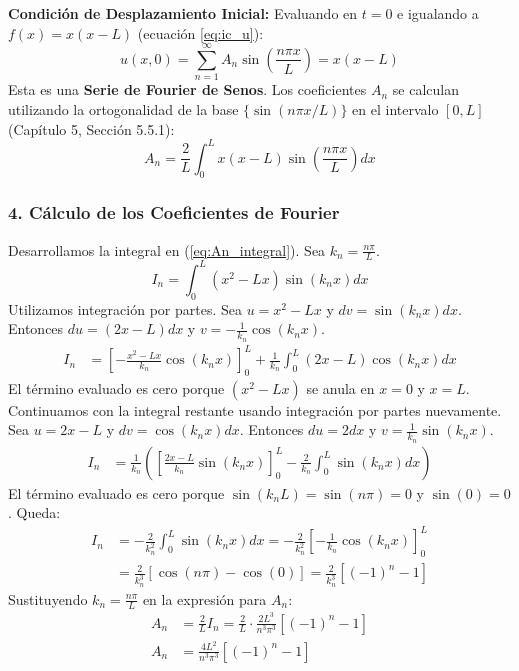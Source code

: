 \documentclass[a4paper]{article}
\begin{document}
\textbf{Condición de Desplazamiento Inicial:}
Evaluando en $t=0$ e igualando a $f(x) = x(x-L)$ (ecuación \ref{eq:ic_u}):
\begin{equation}
u(x, 0) = \sum_{n=1}^{\infty} A_n \sin\left(\frac{n\pi x}{L}\right) = x(x - L)
\end{equation}
Esta es una \textbf{Serie de Fourier de Senos}. Los coeficientes $A_n$ se calculan utilizando la ortogonalidad de la base $\{\sin(n\pi x/L)\}$ en el intervalo $[0, L]$ (Capítulo 5, Sección 5.5.1):
\begin{equation}
A_n = \frac{2}{L} \int_0^L x(x - L) \sin\left(\frac{n\pi x}{L}\right) dx
\label{eq:An_integral}
\end{equation}

\subsubsection{4. Cálculo de los Coeficientes de Fourier}

Desarrollamos la integral en (\ref{eq:An_integral}). Sea $k_n = \frac{n\pi}{L}$.
\begin{equation}
I_n = \int_0^L (x^2 - Lx) \sin(k_n x) dx
\end{equation}
Utilizamos integración por partes. Sea $u = x^2 - Lx$ y $dv = \sin(k_n x) dx$. Entonces $du = (2x - L)dx$ y $v = -\frac{1}{k_n}\cos(k_n x)$.
\begin{align}
I_n &= \left[ -\frac{x^2 - Lx}{k_n} \cos(k_n x) \right]_0^L + \frac{1}{k_n} \int_0^L (2x - L) \cos(k_n x) dx
\end{align}
El término evaluado es cero porque $(x^2 - Lx)$ se anula en $x=0$ y $x=L$. Continuamos con la integral restante usando integración por partes nuevamente. Sea $u = 2x - L$ y $dv = \cos(k_n x) dx$. Entonces $du = 2dx$ y $v = \frac{1}{k_n}\sin(k_n x)$.
\begin{align}
I_n &= \frac{1}{k_n} \left( \left[ \frac{2x - L}{k_n} \sin(k_n x) \right]_0^L - \frac{2}{k_n} \int_0^L \sin(k_n x) dx \right)
\end{align}
El término evaluado es cero porque $\sin(k_n L) = \sin(n\pi) = 0$ y $\sin(0) = 0$. Queda:
\begin{align}
I_n &= -\frac{2}{k_n^2} \int_0^L \sin(k_n x) dx = -\frac{2}{k_n^2} \left[ -\frac{1}{k_n} \cos(k_n x) \right]_0^L \\
&= \frac{2}{k_n^3} [\cos(n\pi) - \cos(0)] = \frac{2}{k_n^3} [(-1)^n - 1]
\end{align}
Sustituyendo $k_n = \frac{n\pi}{L}$ en la expresión para $A_n$:
\begin{align}
A_n &= \frac{2}{L} I_n = \frac{2}{L} \cdot \frac{2 L^3}{n^3 \pi^3} [(-1)^n - 1] \\
A_n &= \frac{4 L^2}{n^3 \pi^3} [(-1)^n - 1]
\end{align}
\end{document}
